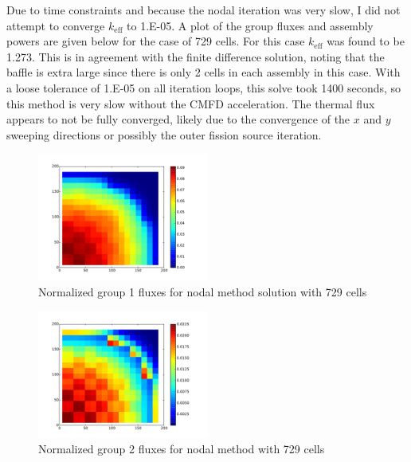\documentclass[12pt]{article}
\newcommand{\keff}{\ensuremath{k_{\mathrm{eff}}}}
\newenvironment{solnum}[2][Solution]{\begin{trivlist}
\item[\hskip \labelsep {\bfseries #1}\hskip \labelsep {\bfseries #2:}]\hspace{0.3in}\newline\newline}{\end{trivlist}}
\begin{document}
\begin{solnum}{1-2}
Due to time constraints and because the nodal iteration was very slow, I did not
attempt to converge $\keff$ to 1.E-05.  A plot of the group fluxes and assembly powers are
given below for the case of 729 cells.  For this case $\keff$ was found to be
1.273.  This is in agreement with the finite difference solution, noting that the baffle is extra
large since there is only 2 cells in each assembly in this case.  With a loose tolerance of 1.E-05 on all iteration loops, this solve took
1400 seconds, so this method is very slow without the CMFD acceleration. The thermal flux appears to not be fully converged, likely due to the convergence of the $x$ and $y$ sweeping directions or possibly the outer fission source iteration.
\begin{figure}
    \centering
    \caption{Normalized group 1 fluxes for nodal method solution with 729 cells}
    \includegraphics[width=0.5\textwidth]{prob1_g1_nodal.pdf}
\end{figure}

\begin{figure}
    \centering
    \caption{Normalized group 2 fluxes for nodal method with 729 cells}
    \includegraphics[width=0.5\textwidth]{prob1_g2_nodal.pdf}
\end{figure}


\end{solnum}
\end{document}
